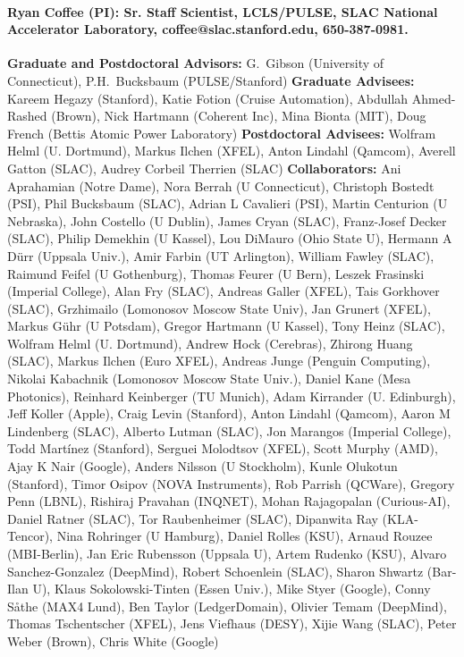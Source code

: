 \documentclass{article}
\begin{document}
\paragraph{Ryan Coffee (PI): Sr. Staff Scientist, LCLS/PULSE, SLAC National Accelerator Laboratory, coffee@slac.stanford.edu, 650-387-0981. }
\textbf{Graduate and Postdoctoral Advisors: } G.~Gibson (University of Connecticut), P.H.~Bucksbaum (PULSE/Stanford)
\textbf{Graduate Advisees: } Kareem Hegazy (Stanford), Katie Fotion (Cruise Automation), Abdullah Ahmed-Rashed (Brown), Nick Hartmann (Coherent Inc), Mina Bionta (MIT), Doug French (Bettis Atomic Power Laboratory)
\textbf{Postdoctoral Advisees: } Wolfram Helml (U. Dortmund), Markus Ilchen (XFEL), Anton Lindahl (Qamcom), Averell Gatton (SLAC), Audrey Corbeil Therrien (SLAC)
\textbf{Collaborators: }
Ani Aprahamian (Notre Dame), Nora Berrah (U Connecticut), Christoph Bostedt (PSI), Phil Bucksbaum (SLAC), Adrian L Cavalieri (PSI), Martin Centurion (U Nebraska), John Costello (U Dublin), James Cryan (SLAC), Franz-Josef Decker (SLAC), Philip Demekhin (U Kassel), Lou DiMauro (Ohio State U), Hermann A Dürr (Uppsala Univ.), Amir Farbin (UT Arlington), William Fawley (SLAC), Raimund Feifel (U Gothenburg), Thomas Feurer (U Bern), Leszek Frasinski (Imperial College), Alan Fry (SLAC), Andreas Galler (XFEL), Tais Gorkhover (SLAC), Grzhimailo (Lomonosov Moscow State Univ), Jan Grunert (XFEL), Markus Gühr (U Potsdam), Gregor Hartmann (U Kassel), Tony Heinz (SLAC), Wolfram Helml (U. Dortmund), Andrew Hock (Cerebras), Zhirong Huang (SLAC), Markus Ilchen (Euro XFEL), Andreas Junge (Penguin Computing), Nikolai Kabachnik (Lomonosov Moscow State Univ.), Daniel Kane (Mesa Photonics), Reinhard Keinberger (TU Munich), Adam Kirrander (U. Edinburgh), Jeff Koller (Apple), Craig Levin (Stanford), Anton Lindahl (Qamcom), Aaron M Lindenberg (SLAC), Alberto Lutman (SLAC), Jon Marangos (Imperial College), Todd Martínez (Stanford), Serguei Molodtsov (XFEL), Scott Murphy (AMD), Ajay K Nair (Google), Anders Nilsson (U Stockholm), Kunle Olukotun (Stanford), Timor Osipov (NOVA Instruments), Rob Parrish (QCWare), Gregory Penn (LBNL), Rishiraj Pravahan (INQNET), Mohan Rajagopalan (Curious-AI), Daniel Ratner (SLAC), Tor Raubenheimer (SLAC), Dipanwita Ray (KLA-Tencor), Nina Rohringer (U Hamburg), Daniel Rolles (KSU), Arnaud Rouzee (MBI-Berlin), Jan Eric Rubensson (Uppsala U), Artem Rudenko (KSU), Alvaro Sanchez-Gonzalez (DeepMind), Robert Schoenlein (SLAC), Sharon Shwartz (Bar-Ilan U), Klaus Sokolowski-Tinten (Essen Univ.), Mike Styer (Google), Conny Såthe (MAX4 Lund), Ben Taylor (LedgerDomain), Olivier Temam (DeepMind), Thomas Tschentscher (XFEL), Jens Viefhaus (DESY), Xijie Wang (SLAC), Peter Weber (Brown), Chris White (Google) 
\end{document}
